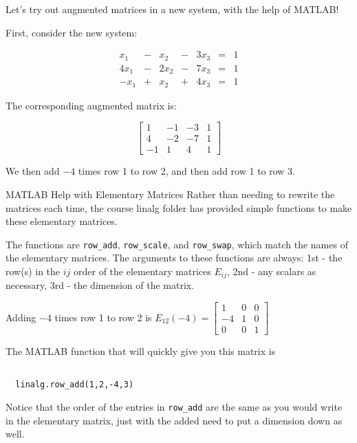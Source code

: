 \documentclass{ximera}
\begin{document}
\begin{exploration}\label{init:backsub}
Let's try out augmented matrices in a new system, with the help of MATLAB!

First, consider the new system:



$$\begin{array}{ccccccc}
      x_1 &- &x_2&-&3x_3&= &1 \\
   4x_1& -&2x_2&-&7x_3&=&1\\
   -x_1& +&x_2&+&4x_3&=&1
    \end{array}$$

The corresponding augmented matrix is: 


 
\[\left[\begin{array}{ccc|c} 
 1&-1&-3&1\\4&-2&-7&1\\-1&1&4&1
 \end{array}\right]\]

 

 We then add $-4$ times row 1 to row 2, and then add row 1 to row 3. 
 
 \begin{remark}{MATLAB Help with Elementary Matrices}
 Rather than needing to rewrite the matrices each time, the course linalg folder has provided simple functions to make these elementary matrices.

The functions are \texttt{row\_add}, \texttt{row\_scale}, and \texttt{row\_swap}, which match the names of the elementary matrices. The arguments to these functions are always: 1st - the row(s) in the $ij$ order of the elementary matrices $E_{ij}$, 2nd - any scalars as necessary, 3rd - the dimension of the matrix. 


Adding $-4$ times row 1 to row 2 is 
$E_{12}(-4)=\begin{bmatrix}
1&0&0\\
-4&1&0\\
0&0&1
\end{bmatrix}$

The MATLAB function that will quickly give you this matrix is 

\begin{verbatim}

  linalg.row_add(1,2,-4,3)

\end{verbatim}

Notice that the order of the entries in \texttt{row\_add} are the same as you would write in the elementary matrix, just with the added need to put a dimension down as well.


\end{remark}
\end{exploration}
\end{document}

